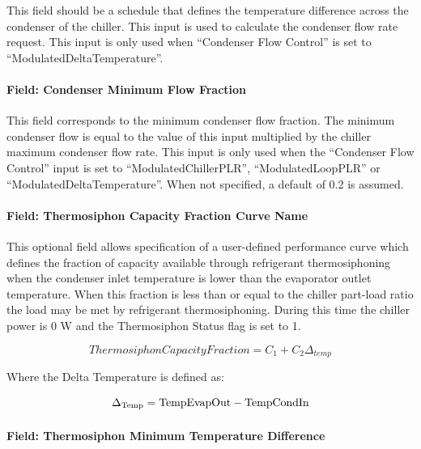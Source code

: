 This field should be a schedule that defines the temperature difference across the condenser of the chiller. This input is used to calculate the condenser flow rate request. This input is only used when ``Condenser Flow Control'' is set to ``ModulatedDeltaTemperature''.

\paragraph{Field: Condenser Minimum Flow Fraction}

This field corresponds to the minimum condenser flow fraction. The minimum condenser flow is equal to the value of this input multiplied by the chiller maximum condenser flow rate. This input is only used when the ``Condenser Flow Control'' input is set to ``ModulatedChillerPLR'', ``ModulatedLoopPLR'' or ``ModulatedDeltaTemperature''. When not specified, a default of 0.2 is assumed.

\paragraph{Field: Thermosiphon Capacity Fraction Curve Name}\label{thermosiphon-capacity-fraction-curve-name3}

This optional field allows specification of a user-defined performance curve which defines the fraction of capacity available through refrigerant thermosiphoning when the condenser inlet temperature is lower than the evaporator outlet temperature. When this fraction is less than or equal to the chiller part-load ratio the load may be met by refrigerant thermosiphoning. During this time the chiller power is 0 W and the Thermosiphon Status flag is set to 1.

\begin{equation}
    ThermosiphonCapacityFraction = {C_1} + {C_2}{\Delta_{temp}}
\end{equation}

Where the Delta Temperature is defined as:

\begin{equation}
{\Delta_{{\rm{Temp}}}}
    = {\rm{TempEvapOut  -  TempCondIn }}
\end{equation}

\paragraph{Field: Thermosiphon Minimum Temperature Difference}\label{thermosiphon-minimum-temperature-difference3}

